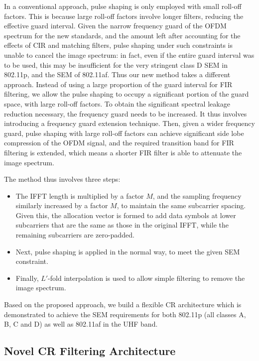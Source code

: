In a conventional approach, pulse shaping is only employed with small roll-off factors.
This is because large roll-off factors involve longer filters, reducing the effective guard interval.
Given the narrow frequency guard of the OFDM spectrum for the new standards, and the amount left after accounting for the effects of CIR and matching filters, pulse shaping under such constraints is unable to cancel the image spectrum: in fact, even if the entire guard interval was to be used, this may be insufficient for the very stringent class D SEM in 802.11p, and the SEM of 802.11af.
Thus our new method takes a different approach.
Instead of using a large proportion of the guard interval for FIR filtering, we allow the pulse shaping to occupy a significant portion of the guard space, with large roll-off factors.
To obtain the significant spectral leakage reduction necessary, the frequency guard needs to be increased.
It thus involves introducing a frequency guard extension technique.
Then, given a wider frequency guard, pulse shaping with large roll-off factors can achieve significant side lobe compression of the OFDM signal, and the required transition band for FIR filtering is extended, which means a shorter FIR filter is able to attenuate the image spectrum.

The method thus involves three steps:

\begin{itemize}
\item The IFFT length is multiplied by a factor $M$, and the sampling frequency similarly increased by a factor $M$, to maintain the same subcarrier spacing.
Given this, the allocation vector is formed to add data symbols at lower subcarriers that are the same as those in the original IFFT, while the remaining subcarriers are zero-padded.
\item Next, pulse shaping is applied in the normal way, to meet the given SEM constraint.
\item Finally, $L'$-fold interpolation is used to allow simple filtering to remove the image spectrum.
\end{itemize}

Based on the proposed approach, we build a flexible CR architecture which is demonstrated to achieve the SEM requirements for both 802.11p (all classes A, B, C and D) as well as 802.11af in the UHF band.

\subsection{Novel CR Filtering Architecture}

